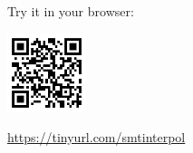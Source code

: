 \documentclass[table,aspectratio=169]{beamer}
\begin{document}
\begin{frame}
\begin{columns}[t]
\begin{column}{.5\textwidth}
    Try it in your browser:\\[2pt]
    \centerline{\href{https://ultimate.informatik.uni-freiburg.de/smtinterpol/online}{\includegraphics[width=2.3cm]{smtinterpol-url}}}
    \centerline{\url{https://tinyurl.com/smtinterpol}}
  \end{column}
  \end{columns}
\end{frame}
\end{document}
